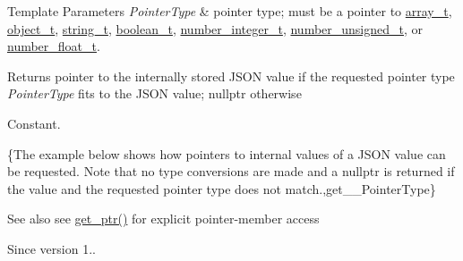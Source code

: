 \begin{DoxyTemplParams}{Template Parameters}
{\em Pointer\+Type} & pointer type; must be a pointer to \hyperlink{classnlohmann_1_1basic__json_a858c1cf8407bc06494e3a1114a3b73e7}{array\+\_\+t}, \hyperlink{classnlohmann_1_1basic__json_aef3ff5a73597850597d1d40db9edd376}{object\+\_\+t}, \hyperlink{classnlohmann_1_1basic__json_a33593865ffb1860323dcbd52425b90c8}{string\+\_\+t}, \hyperlink{classnlohmann_1_1basic__json_a44fd1a12c9c54623c942b430e7a72937}{boolean\+\_\+t}, \hyperlink{classnlohmann_1_1basic__json_a11e390944da90db83089eb2426a749d3}{number\+\_\+integer\+\_\+t}, \hyperlink{classnlohmann_1_1basic__json_ae09af9c23351b7245d9be4d1b2035fef}{number\+\_\+unsigned\+\_\+t}, or \hyperlink{classnlohmann_1_1basic__json_a5b8abaebd922d82d69756327c0c347e6}{number\+\_\+float\+\_\+t}.\\
\hline
\end{DoxyTemplParams}
\begin{DoxyReturn}{Returns}
pointer to the internally stored J\+S\+ON value if the requested pointer type {\itshape Pointer\+Type} fits to the J\+S\+ON value; {\ttfamily nullptr} otherwise
\end{DoxyReturn}
Constant.

\{The example below shows how pointers to internal values of a J\+S\+ON value can be requested. Note that no type conversions are made and a {\ttfamily nullptr} is returned if the value and the requested pointer type does not match.,get\+\_\+\+\_\+\+Pointer\+Type\}

\begin{DoxySeeAlso}{See also}
see \hyperlink{classnlohmann_1_1basic__json_ac3698ce827dcd4f0c81455461709938d}{get\+\_\+ptr()} for explicit pointer-\/member access
\end{DoxySeeAlso}
\begin{DoxySince}{Since}
version 1.. 
\end{DoxySince}
\mbox{\label{classnlohmann_1_1basic__json_afc55e7dca1a243b0d5011564824c0267}} 
